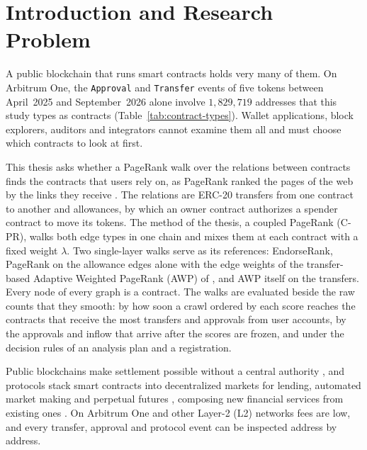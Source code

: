 \chapter{Introduction and Research Problem}
\label{ch:introduction}

A public blockchain that runs smart contracts holds very many of them. On Arbitrum One, the \texttt{Approval} and \texttt{Transfer} events of five tokens between April~2025 and September~2026 alone involve $1{,}829{,}719$ addresses that this study types as contracts (Table~\ref{tab:contract-types}). Wallet applications, block explorers, auditors and integrators cannot examine them all and must choose which contracts to look at first.

This thesis asks whether a PageRank walk over the relations between contracts finds the contracts that users rely on, as PageRank ranked the pages of the web by the links they receive \parencite{page1999pagerank}. The relations are ERC-20 transfers from one contract to another and allowances, by which an owner contract authorizes a spender contract to move its tokens. The method of the thesis, a coupled PageRank (\mbox{C-PR}), walks both edge types in one chain and mixes them at each contract with a fixed weight $\lambda$. Two single-layer walks serve as its references: EndorseRank, PageRank on the allowance edges alone with the edge weights of the transfer-based Adaptive Weighted PageRank (AWP) of \textcite{do2023awp}, and AWP itself on the transfers. Every node of every graph is a contract. The walks are evaluated beside the raw counts that they smooth: by how soon a crawl ordered by each score reaches the contracts that receive the most transfers and approvals from user accounts, by the approvals and inflow that arrive after the scores are frozen, and under the decision rules of an analysis plan and a registration.


Public blockchains make settlement possible without a central authority \parencite{nakamoto2008bitcoin}, and protocols stack smart contracts \parencite{szabo1997formalizing} into decentralized markets for lending, automated market making and perpetual futures \parencite{werner2022sok}, composing new financial services from existing ones \parencite{kitzler2023defi}. On Arbitrum One and other Layer-2 (L2) networks fees are low, and every transfer, approval and protocol event can be inspected address by address.

